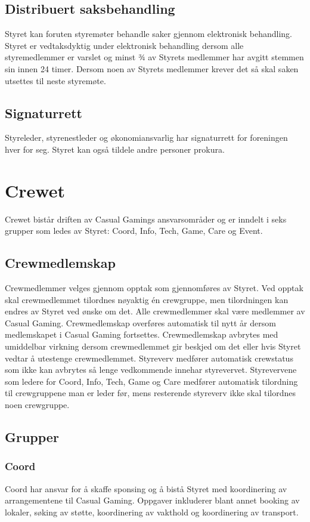 \subsection{Distribuert saksbehandling}
Styret kan foruten styremøter behandle saker gjennom elektronisk behandling. Styret er vedtaksdyktig under elektronisk behandling dersom alle styremedlemmer er varslet og minst ¾ av Styrets medlemmer har avgitt stemmen sin innen 24 timer. Dersom noen av Styrets medlemmer krever det så skal saken utsettes til neste styremøte.

\subsection{Signaturrett}
Styreleder, styrenestleder og økonomiansvarlig har signaturrett for foreningen hver for seg. Styret kan også tildele andre personer prokura.

\section{Crewet}
Crewet bistår driften av Casual Gamings ansvarsområder og er inndelt i seks grupper som ledes av Styret: Coord, Info, Tech, Game, Care og Event.

\subsection{Crewmedlemskap}
Crewmedlemmer velges gjennom opptak som gjennomføres av Styret. Ved opptak skal crewmedlemmet tilordnes nøyaktig én crewgruppe, men tilordningen kan endres av Styret ved ønske om det. Alle crewmedlemmer skal være medlemmer av Casual Gaming. Crewmedlemskap overføres automatisk til nytt år dersom medlemskapet i Casual Gaming fortsettes. Crewmedlemskap avbrytes med umiddelbar virkning dersom crewmedlemmet gir beskjed om det eller hvis Styret vedtar å utestenge crewmedlemmet. Styreverv medfører automatisk crewstatus som ikke kan avbrytes så lenge vedkommende innehar styrevervet. Styrevervene som ledere for Coord, Info, Tech, Game og Care medfører automatisk tilordning til crewgruppene man er leder før, mens resterende styreverv ikke skal tilordnes noen crewgruppe.

\subsection{Grupper}

\subsubsection{Coord}
Coord har ansvar for å skaffe sponsing og å bistå Styret med koordinering av arrangementene til Casual Gaming. Oppgaver inkluderer blant annet booking av lokaler, søking av støtte, koordinering av vakthold og koordinering av transport.

